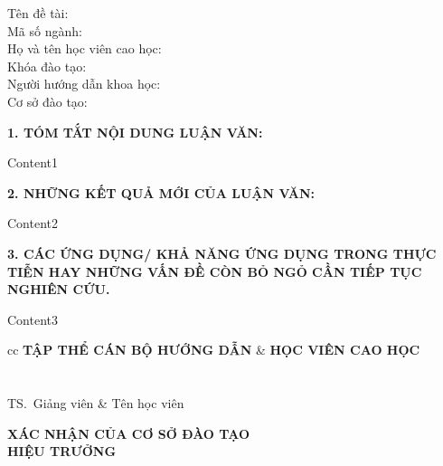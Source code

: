 \begin{flushleft}
	Tên đề tài:  \\
	Mã số ngành:  \\
	Họ và tên học viên cao học:  \\
	Khóa đào tạo:  \\
	Người hướng dẫn khoa học: \\
	Cơ sở đào tạo: \\
\end{flushleft}

\textbf{1. TÓM TẮT NỘI DUNG LUẬN VĂN:}

Content1

\textbf{2. NHỮNG KẾT QUẢ MỚI CỦA LUẬN VĂN:}

Content2

\textbf{3. CÁC ỨNG DỤNG/ KHẢ NĂNG ỨNG DỤNG TRONG THỰC TIỄN HAY NHỮNG VẤN ĐỀ CÒN BỎ NGỎ CẦN TIẾP TỤC NGHIÊN CỨU.}

Content3


\vspace{1.5em}
\begin{tblr}{cc}
	\centering
	\textbf{TẬP THỂ CÁN BỘ HƯỚNG DẪN} & \textbf{\hspace{5.0em}HỌC VIÊN CAO HỌC} \\
	\\
	\\
	TS.~Giảng viên                   & \hspace{5.0em} Tên học viên
\end{tblr}

\vspace{2.5em}
\begin{center}
	\textbf{XÁC NHẬN CỦA CƠ SỞ ĐÀO TẠO} \\
	\textbf{HIỆU TRƯỞNG}
\end{center}